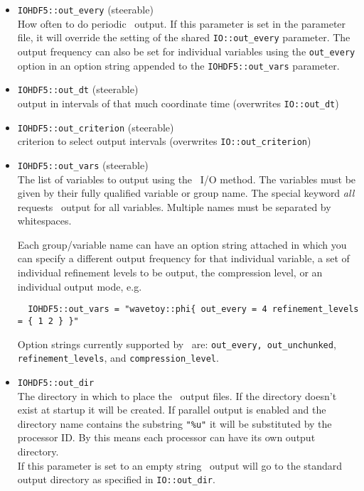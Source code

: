 \documentclass{article}
\begin{document}
\begin{itemize}
  \item {\tt IOHDF5::out\_every} (steerable)\\
        How often to do periodic \ThisThorn\ output. If this parameter is set
        in the parameter file, it will override the setting of the shared
        {\tt IO::out\_every} parameter. The output frequency can also be set
        for individual variables using the {\tt out\_every} option in an option
        string appended to the {\tt IOHDF5::out\_vars} parameter.

  \item {\tt IOHDF5::out\_dt} (steerable)\\
        output in intervals of that much coordinate time (overwrites {\tt IO::out\_dt})

  \item {\tt IOHDF5::out\_criterion} (steerable)\\
        criterion to select output intervals (overwrites {\tt IO::out\_criterion})

  \item {\tt IOHDF5::out\_vars} (steerable)\\
        The list of variables to output using the \ThisThorn\ I/O method.
        The variables must be given by their fully qualified variable or group
        name. The special keyword {\it all} requests \ThisThorn\ output for
        all variables. Multiple names must be separated by whitespaces.

        Each group/variable name can have an option string attached in which you
        can specify a different output frequency for that individual variable,
	a set of individual refinement levels to be output, the compression
        level, or an individual output mode, e.g.
\begin{verbatim}
  IOHDF5::out_vars = "wavetoy::phi{ out_every = 4 refinement_levels = { 1 2 } }"
\end{verbatim}
        Option strings currently supported by \ThisThorn\ are: {\tt out\_every,
        out\_unchunked}, {\tt refinement\_levels}, and {\tt compression\_level}.

  \item {\tt IOHDF5::out\_dir}\\
        The directory in which to place the \ThisThorn\ output files.
        If the directory doesn't exist at startup it will be created.
        If parallel output is enabled and the directory name contains the
        substring {\tt "\%u"} it will be substituted by the processor ID.
        By this means each processor can have its own output directory.\\
        If this parameter is set to an empty string \ThisThorn\ output will go
        to the standard output directory as specified in {\tt IO::out\_dir}.


\end{itemize}
\end{document}
